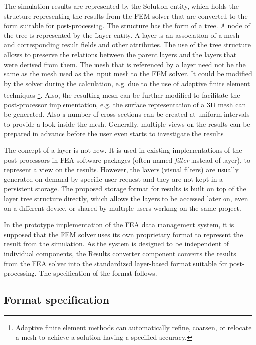 The simulation results are represented by the Solution entity, which holds the structure representing the results from the FEM solver that are converted to the form suitable for post-processing. The structure has the form of a tree. A node of the tree is represented by the Layer entity. A layer is an association of a mesh and corresponding result fields and other attributes. The use of the tree structure allows to preserve the relations between the parent layers and the layers that were derived from them. The mesh that is referenced by a layer need not be the same as the mesh used as the input mesh to the FEM solver. It could be modified by the solver during the calculation, e.g. due to the use of adaptive finite element techniques \footnote{Adaptive finite element methods can automatically refine, coarsen, or relocate a mesh to achieve a solution having a specified accuracy.}. Also, the resulting mesh can be further modified to facilitate the post-processor implementation, e.g. the surface representation of a 3D mesh can be generated. Also a number of cross-sections can be created at uniform intervals to provide a look inside the mesh. Generally, multiple views on the results can be prepared in advance before the user even starts to investigate the results.

The concept of a layer is not new. It is used in existing implementations of the post-processors in FEA software packages (often named \textit{filter} instead of layer), to represent a view on the results. However, the layers (visual filters) are usually generated on demand by specific user request and they are not kept in a persistent storage. The proposed storage format for results is built on top of the layer tree structure directly, which allows the layers to be accessed later on, even on a different device, or shared by multiple users working on the same project.

In the prototype implementation of the FEA data management system, it is supposed that the FEM solver uses its own proprietary format to represent the result from the simulation. As the system is designed to be independent of individual components, the Results converter component converts the results from the FEA solver into the standardized layer-based format suitable for post-processing. The specification of the format follows.

\subsection{Format specification}

